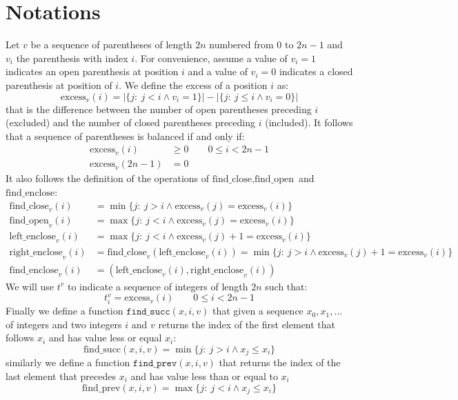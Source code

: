 \documentclass{article}
\begin{document}
\section{Notations}
Let $v$ be a sequence of parentheses of length $2n$ numbered from $0$ to $2n-1$ and $v_i$ the parenthesis with index $i$. For convenience, assume a value of $v_i=1$ indicates an open parenthesis at position $i$ and a value of $v_i=0$ indicates a closed parenthesis at position of $i$. We define the excess of a position $i$ as:
    $$
    \text{excess}_v(i) = |\{j :\ j<i \land v_i=1\}|-|\{j :\ j\leq i \land v_i=0\}|
    $$
that is the difference between the number of open parentheses preceding $i$ (excluded) and the number of closed parentheses preceding $i$ (included).
It follows that a sequence of parentheses is balanced if and only if:
    \begin{align*}
    \text{excess}_v(i) &\geq 0 \qquad 0\leq i < 2n-1 \\
    \text{excess}_v(2n-1) &= 0
    \end{align*}
It also follows the definition of the operations of $\text{find\_close}, \text{find\_open}$ and $\text{find\_enclose}$:
    \begin{align*}
    \text{find\_close}_v(i) &= \min\{j :\ j>i \land \text{excess}_v(j)=\text{excess}_v(i)\} \\
    \text{find\_open}_v(i) &= \max\{j :\ j<i \land \text{excess}_v(j)=\text{excess}_v(i)\} \\
    \text{left\_enclose}_v(i) &= \max\{j :\ j<i \land \text{excess}_v(j)+1=\text{excess}_v(i)\} \\
    \text{right\_enclose}_v(i) &= \text{find\_close}_v(\text{left\_enclose}_v(i)) = \min\{j :\ j>i \land \text{excess}_v(j)+1=\text{excess}_v(i)\} \\
    \text{find\_enclose}_v(i) &= (\text{left\_enclose}_v(i),\text{right\_enclose}_v(i))
    \end{align*}
We will use $t^v$ to indicate a sequence of integers of length $2n$ such that:
    $$
    t^v_i=\text{excess}_v(i) \qquad 0\leq i < 2n-1
    $$
Finally we define a function $\texttt{find\_succ}(x,i,v)$ that given a sequence $x_0,x_1,\dots$ of integers and two integers $i$ and $v$ returns the index of the first element that follows $x_i$ and has value less or equal $x_i$:
    $$
    \text{find\_succ}(x,i,v)=\min\{j :\ j>i \land x_j\leq x_i\}
    $$
similarly we define a function $\texttt{find\_prev}(x,i,v)$ that returns the index of the last element that precedes $x_i$ and has value less than or equal to $x_i$
    $$
    \text{find\_prev}(x,i,v)=\max\{j :\ j<i \land x_j\leq x_i\}
    $$
\end{document}
